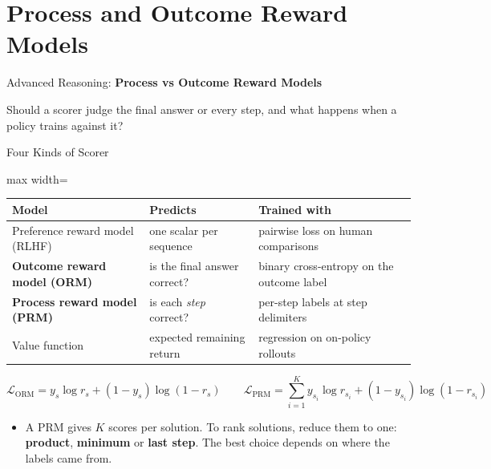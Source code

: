 \section{Process and Outcome Reward Models}

\begin{frame}{}
    \LARGE Advanced Reasoning: \textbf{Process vs Outcome Reward Models}

    \vspace{1em}
    \normalsize Should a scorer judge the final answer or every step, and what happens when a policy trains against it?
\end{frame}

\begin{frame}{Four Kinds of Scorer}
    \begin{center}
    \small
    \renewcommand{\arraystretch}{1.05}
    \begin{adjustbox}{max width=\linewidth}\begin{tabular}{>{\raggedright\arraybackslash}p{3.6cm}>{\raggedright\arraybackslash}p{4.6cm}>{\raggedright\arraybackslash}p{5.4cm}}
        \toprule
        \textbf{Model} & \textbf{Predicts} & \textbf{Trained with} \\
        \midrule
        Preference reward model (RLHF) & one scalar per sequence & pairwise loss on human comparisons \\
        \textbf{Outcome reward model (ORM)} & is the final answer correct? & binary cross-entropy on the outcome label \\
        \rowcolor{KAUSTcyan!12} \textbf{Process reward model (PRM)} & is each \emph{step} correct? & per-step labels at step delimiters \\
        Value function & expected remaining return & regression on on-policy rollouts \\
        \bottomrule
    \end{tabular}\end{adjustbox}
    \end{center}
    \vspace{-0.3em}
    \[
        \mathcal{L}_{\text{ORM}} = y_s \log r_s + (1-y_s)\log(1-r_s)
        \qquad
        \mathcal{L}_{\text{PRM}} = \sum_{i=1}^{K} y_{s_i}\log r_{s_i} + (1-y_{s_i})\log(1-r_{s_i})
    \]
    \begin{itemize}\itemsep0.3em
        \item A PRM gives $K$ scores per solution. To rank solutions, reduce them to one: \textbf{product}, \textbf{minimum} or \textbf{last step}. The best choice depends on where the labels came from.
    \end{itemize}
\end{frame}

